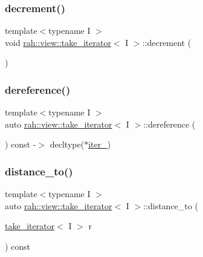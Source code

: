 \subsubsection{\texorpdfstring{decrement()}{decrement()}}
{\footnotesize\ttfamily template$<$typename I $>$ \\
void \mbox{\hyperlink{structrah_1_1view_1_1take__iterator}{rah\+::view\+::take\+\_\+iterator}}$<$ I $>$\+::decrement (\begin{DoxyParamCaption}{ }\end{DoxyParamCaption})\hspace{0.3cm}{\ttfamily [inline]}}

\mbox{\label{structrah_1_1view_1_1take__iterator_af6fe7bae848e71f68dcdf12565db2c52}} 
\subsubsection{\texorpdfstring{dereference()}{dereference()}}
{\footnotesize\ttfamily template$<$typename I $>$ \\
auto \mbox{\hyperlink{structrah_1_1view_1_1take__iterator}{rah\+::view\+::take\+\_\+iterator}}$<$ I $>$\+::dereference (\begin{DoxyParamCaption}{ }\end{DoxyParamCaption}) const -\/$>$ decltype($\ast$\mbox{\hyperlink{structrah_1_1view_1_1take__iterator_abbc947797abfa6ecaeb91c8185212152}{iter\+\_\+}}) \hspace{0.3cm}{\ttfamily [inline]}}

\mbox{\label{structrah_1_1view_1_1take__iterator_a6516d99883863b621df6717bf1d4613b}} 
\subsubsection{\texorpdfstring{distance\_to()}{distance\_to()}}
{\footnotesize\ttfamily template$<$typename I $>$ \\
auto \mbox{\hyperlink{structrah_1_1view_1_1take__iterator}{rah\+::view\+::take\+\_\+iterator}}$<$ I $>$\+::distance\+\_\+to (\begin{DoxyParamCaption}\item[{\mbox{\hyperlink{structrah_1_1view_1_1take__iterator}{take\+\_\+iterator}}$<$ I $>$}]{r }\end{DoxyParamCaption}) const\hspace{0.3cm}{\ttfamily [inline]}}

